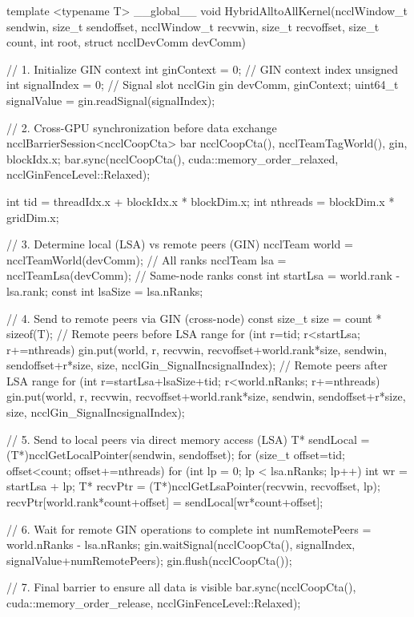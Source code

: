 template <typename T>
__global__ void HybridAlltoAllKernel(ncclWindow_t sendwin,
  size_t sendoffset, ncclWindow_t recvwin,
  size_t recvoffset, size_t count, int root,
  struct ncclDevComm devComm) {
  // 1. Initialize GIN context
  int ginContext = 0; // GIN context index
  unsigned int signalIndex = 0; // Signal slot
  ncclGin gin {devComm, ginContext};
  uint64_t signalValue = gin.readSignal(signalIndex);

  // 2. Cross-GPU synchronization before data exchange
  ncclBarrierSession<ncclCoopCta> bar {ncclCoopCta(),
    ncclTeamTagWorld(), gin, blockIdx.x};
  bar.sync(ncclCoopCta(), cuda::memory_order_relaxed,
    ncclGinFenceLevel::Relaxed);

  int tid = threadIdx.x + blockIdx.x * blockDim.x;
  int nthreads = blockDim.x * gridDim.x;

  // 3. Determine local (LSA) vs remote peers (GIN)
  ncclTeam world = ncclTeamWorld(devComm); // All ranks
  ncclTeam lsa = ncclTeamLsa(devComm); // Same-node ranks
  const int startLsa = world.rank - lsa.rank;
  const int lsaSize = lsa.nRanks;

  // 4. Send to remote peers via GIN (cross-node)
  const size_t size = count * sizeof(T);
  // Remote peers before LSA range
  for (int r=tid; r<startLsa; r+=nthreads) {
    gin.put(world, r, recvwin, recvoffset+world.rank*size,
      sendwin, sendoffset+r*size, size, ncclGin_SignalInc{signalIndex});
  }
  // Remote peers after LSA range
  for (int r=startLsa+lsaSize+tid; r<world.nRanks; r+=nthreads) {
    gin.put(world, r, recvwin,
      recvoffset+world.rank*size, sendwin, sendoffset+r*size,
      size, ncclGin_SignalInc{signalIndex});
  }

  // 5. Send to local peers via direct memory access (LSA)
  T* sendLocal = (T*)ncclGetLocalPointer(sendwin, sendoffset);
  for (size_t offset=tid; offset<count; offset+=nthreads) {
    for (int lp = 0; lp < lsa.nRanks; lp++) {
      int wr = startLsa + lp;
      T* recvPtr = (T*)ncclGetLsaPointer(recvwin, recvoffset, lp);
      recvPtr[world.rank*count+offset] = sendLocal[wr*count+offset];
    }
  }

  // 6. Wait for remote GIN operations to complete
  int numRemotePeers = world.nRanks - lsa.nRanks;
  gin.waitSignal(ncclCoopCta(), signalIndex, signalValue+numRemotePeers);
  gin.flush(ncclCoopCta());

  // 7. Final barrier to ensure all data is visible
  bar.sync(ncclCoopCta(), cuda::memory_order_release,
    ncclGinFenceLevel::Relaxed);
}
